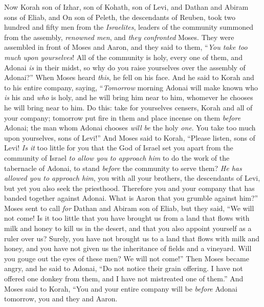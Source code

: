 \begin{biblechapter} %
 Now Korah son of Izhar, son of Kohath, son of Levi, and Dathan and Abiram sons of Eliab, and On son of Peleth, the descendants of Reuben,
\verse took two hundred and fifty men from the \textit{Israelites}, leaders of the community summoned from the assembly, \textit{renowned men}, and \textit{they confronted} Moses.
\verse They were assembled in front of Moses and Aaron, and they said to them, “\textit{You take too much upon yourselves}! All of the community is holy, every one of them, and Adonai \textit{is} in their midst, so why do you raise yourselves over the assembly of Adonai?”
\verse When Moses heard \textit{this}, he fell on his face.
\verse And he said to Korah and to his entire company, saying, “\textit{Tomorrow} morning Adonai will make known who \textit{is} his and \textit{who} is holy, and he will bring him near to him, whomever he chooses he will bring near to him.
\verse Do this: take for yourselves censers, Korah and all of your company;
\verse tomorrow put fire in them and place incense on them \textit{before} Adonai; the man whom Adonai chooses \textit{will be} the holy \textit{one}. You take too much upon yourselves, sons of Levi!”
\verse And Moses said to Korah, “Please listen, sons of Levi!
\verse \textit{Is it} too little for you that the God of Israel set you apart from the community of Israel \textit{to allow you to approach him} to do the work of the tabernacle of Adonai, to stand \textit{before} the community to serve them?
\verse \textit{He has allowed you to approach him}, you with all your brothers, the descendants of Levi, but yet you also seek the priesthood.
\verse Therefore you and your company that has banded together against Adonai. What is Aaron that you grumble against him?”
\verse Moses sent to call \textit{for} Dathan and Abiram son of Eliab, but they said, “We will not come!
\verse Is it too little that you have brought us from a land that flows with milk and honey to kill us in the desert, and that you also appoint yourself as a ruler over us?
\verse Surely, you have not brought us to a land that flows with milk and honey, and you have not given us the inheritance of fields and a vineyard. Will you gouge out the eyes of these men? We will not come!”
\verse Then Moses became angry, and he said to Adonai, “Do not notice their grain offering. I have not offered one donkey from them, and I have not mistreated one of them.”
\verse And Moses said to Korah, “You and your entire company will be \textit{before} Adonai tomorrow, you and they and Aaron.

\end{biblechapter}
